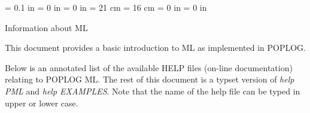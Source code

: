 




\parskip = 0.1 in
\parindent = 0 in
\topmargin = 0 in
\textheight= 21 cm
\textwidth = 16 cm
\oddsidemargin = 0 in
\evensidemargin = 0 in





\begin{Huge}\begin{center} Information about ML
\end{center}\end{Huge}

This document provides a basic introduction to ML as implemented in POPLOG.

Below is an annotated list of the available HELP files (on-line documentation)
relating to POPLOG ML.  The rest of this document is a typset version of {\em
help PML} and {\em help EXAMPLES}.  Note that the name of the help file
can be typed in upper or lower case.


